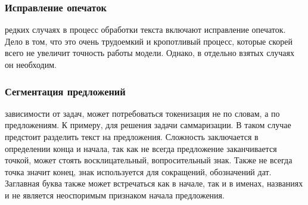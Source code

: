 \documentclass{article}
\newcommand\tab[1][1cm]{\hspace*{#1}}
\begin{document}
\subsubsection{Исправление опечаток}
 редких случаях в процесс обработки текста включают исправление опечаток. Дело в том, что это очень трудоемкий и кропотливый процесс, которые скорей всего не увеличит точность работы модели. Однако, в отдельно взятых случаях он необходим.
\subsubsection{Сегментация предложений}
 зависимости от задач, может потребоваться токенизация не по словам, а по предложениям. К примеру, для решения задачи саммаризации. В таком случае предстоит разделить текст на предложения. Сложность заключается в определении конца и начала, так как не всегда предложение заканчивается точкой, может стоять восклицательный, вопросительный знак. Также не всегда точка значит конец, знак используется для сокращений, обозначений дат. Заглавная буква также может встречаться как в начале, так и в именах, названиях и не является неоспоримым признаком начала предложения.
\end{document}
